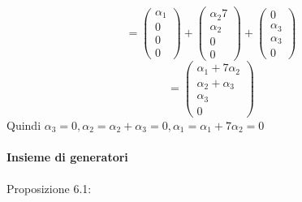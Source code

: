 \documentclass[12pt]{article}
\begin{document}
\[= \begin{pmatrix}
    \alpha_1\\
    0\\
    0\\
    0
\end{pmatrix} + \begin{pmatrix}
    \alpha_2 7\\
    \alpha_2\\
    0\\
    0
\end{pmatrix} + \begin{pmatrix}
    0\\
    \alpha_3\\
    \alpha_3\\
    0
\end{pmatrix}\]
\[= \begin{pmatrix}
    \alpha_1 + 7\alpha_2\\
    \alpha_2 + \alpha_3\\
    \alpha_3\\
    0
\end{pmatrix}\]
Quindi $\alpha_3 = 0, \alpha_2 = \alpha_2 + \alpha_3 = 0, \alpha_1 = \alpha_1 + 7\alpha_2 = 0$\\\\
\textbf{Insieme di generatori}
\\\\
Proposizione 6.1:
\end{document}
